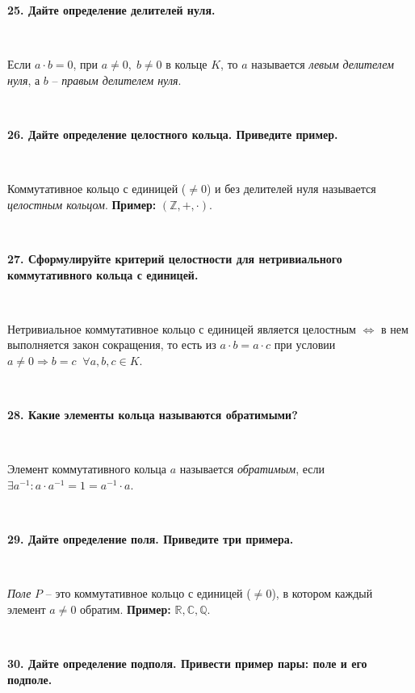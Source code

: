 \documentclass{article}
\begin{document}
	\textbf{25. Дайте определение делителей нуля.}
	
	{
		$\;$
		\setlength{\parindent}{0.4cm}
		\hangindent=0.4cm
		
		Если $a\cdot b=0$, при $a\ne 0, \; b\ne 0$ в кольце $K$, то $a$ называется \textit{левым делителем нуля}, а $b$ -- \textit{правым делителем нуля}.
		
		$\;$
		\setlength{\parindent}{0cm}
		\hangindent=0cm
	}
	
	\textbf{26. Дайте определение целостного кольца. Приведите пример.}
	
	{
		$\;$
		\setlength{\parindent}{0.4cm}
		\hangindent=0.4cm
		
		Коммутативное кольцо с единицей ($\ne 0$) и без делителей нуля называется \textit{целостным кольцом}. \textbf{Пример:} $(\mathbb{Z}, +, \cdot)$.
		
		
		$\;$
		\setlength{\parindent}{0cm}
		\hangindent=0cm
	}
	
	\textbf{27. Сформулируйте критерий целостности для нетривиального коммутативного кольца с единицей.}
	
	{
		$\;$
		\setlength{\parindent}{0.4cm}
		\hangindent=0.4cm
		
		Нетривиальное коммутативное кольцо с единицей является целостным $\Leftrightarrow$ в нем выполняется закон сокращения, то есть из $a\cdot b=a\cdot c$ при условии $a\ne 0\Rightarrow b=c\;\;\forall a, b, c\in K$.
		
		$\;$
		\setlength{\parindent}{0cm}
		\hangindent=0cm
	}
	
	\textbf{28. Какие элементы кольца называются обратимыми?}
	
	{
		$\;$
		\setlength{\parindent}{0.4cm}
		\hangindent=0.4cm
		
		Элемент коммутативного кольца $a$ называется \textit{обратимым}, если $\exists a^{-1}:a\cdot a^{-1}=1=a^{-1}\cdot a$.
		
		$\;$
		\setlength{\parindent}{0cm}
		\hangindent=0cm
	}
	
	\textbf{29. Дайте определение поля. Приведите три примера.}
	
	{
		$\;$
		\setlength{\parindent}{0.4cm}
		\hangindent=0.4cm
		
		\textit{Поле} $P$ -- это коммутативное кольцо с единицей ($\ne 0$), в котором каждый элемент $a\ne 0$ обратим. \textbf{Пример:} $\mathbb{R}, \mathbb{C}, \mathbb{Q}$.
		
		$\;$
		\setlength{\parindent}{0cm}
		\hangindent=0cm
	}
	
	\textbf{30. Дайте определение подполя. Привести пример пары: поле и его подполе.}
	
\end{document}
